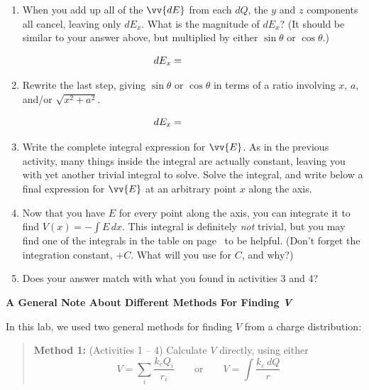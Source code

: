 \begin{enumerate}[labparts, start=3] %

\item When you add up all of the $\vv{dE}$ from each $dQ$, the $y$ and $z$ components all cancel, leaving only $dE_x$.   What is the magnitude of $dE_x$?  (It should be similar to your answer above, but multiplied by either $\sin \theta$ or $\cos \theta$.)

$$dE_x=\hspace{0.7in}$$
\answerspace{0.1in}

\pagebreak[2]
\item Rewrite the last step, giving  $\sin \theta$ or $\cos \theta$ in terms of a ratio involving $x$, $a$, and/or $\sqrt{x^2 + a^2}$.

$$dE_x=\hspace{0.7in}$$

\medskip

\item Write the complete integral expression for $\vv{E}$.  As in the previous activity, many things inside the integral are actually constant, leaving you with yet another trivial integral to solve.  Solve the integral, and write below a final expression for $\vv{E}$ at an arbitrary point $x$ along the axis.  
\answerspace{0.8in}

\item Now that you have $E$ for every point along the axis, you can integrate it to find $V(x) = - \int{E \, dx}$.  This integral is definitely \textit{not} trivial, but you may find one of the integrals in the table on 
page~\pageref{part_potential_charge_distributions_exact_rod} to be helpful.  (Don't forget the integration constant, $+C$.  What will you use for $C$, and why?)
\vfill

\item Does your answer match with what you found in activities 3 and 4?
\answerspace{0.3in}

\end{enumerate}

\textbf{A General Note About Different Methods For Finding \textit{V}}

In this lab, we used two general methods for finding $V$ from a charge distribution:

\begin{quote}
\textbf{Method 1:} (Activities 1 -- 4) Calculate $V$ directly, using either
$$V = \sum_i{\frac{k_e Q_i}{r_i}}
\qquad  \mathrm{or} \qquad  
V = \int{\frac{k_e \, dQ}{r}}$$
\end{quote}

